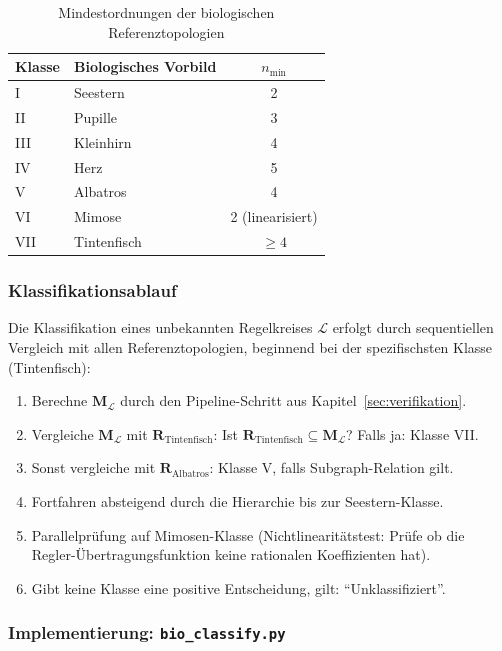 \documentclass[a4paper,12pt]{article}
\theoremstyle{definition}
\begin{document}
\begin{table}[h]
	\centering
	\begin{tabular}{@{}llc@{}}
		\toprule
		\textbf{Klasse} & \textbf{Biologisches Vorbild} & $n_{\min}$ \\
		\midrule
		I   & Seestern    & 2 \\
		II  & Pupille     & 3 \\
		III & Kleinhirn   & 4 \\
		IV  & Herz        & 5 \\
		V   & Albatros    & 4 \\
		VI  & Mimose      & 2 (linearisiert) \\
		VII & Tintenfisch & $\geq 4$ \\
		\bottomrule
	\end{tabular}
	\caption{Mindestordnungen der biologischen Referenztopologien}
	\label{tab:bio_nmin}
\end{table}

\subsubsection{Klassifikationsablauf}

Die Klassifikation eines unbekannten Regelkreises $\mathcal{L}$ erfolgt durch
sequentiellen Vergleich mit allen Referenztopologien, beginnend bei der
spezifischsten Klasse (Tintenfisch):

\begin{enumerate}
	\item Berechne $\mathbf{M}_\mathcal{L}$ durch den Pipeline-Schritt aus
	Kapitel~\ref{sec:verifikation}.
	\item Vergleiche $\mathbf{M}_\mathcal{L}$ mit $\mathbf{R}_{\text{Tintenfisch}}$:
	Ist $\mathbf{R}_{\text{Tintenfisch}} \subseteq \mathbf{M}_\mathcal{L}$?
	Falls ja: Klasse VII.
	\item Sonst vergleiche mit $\mathbf{R}_{\text{Albatros}}$: Klasse V, falls
	Subgraph-Relation gilt.
	\item Fortfahren absteigend durch die Hierarchie bis zur Seestern-Klasse.
	\item Parallelprüfung auf Mimosen-Klasse (Nichtlinearitätstest:
	Prüfe ob die Regler-Übertragungsfunktion keine rationalen Koeffizienten hat).
	\item Gibt keine Klasse eine positive Entscheidung, gilt: ``Unklassifiziert''.
\end{enumerate}

\subsubsection{Implementierung: \texttt{bio\_classify.py}}
\end{document}
